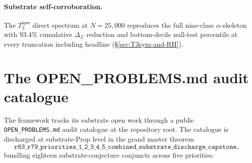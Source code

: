 \documentclass[11pt,a4paper]{amsart}
\theoremstyle{plain}
\theoremstyle{definition}
\begin{document}
\paragraph{Substrate self-corroboration.} The $T_3^{\textsf{sym}}$ direct spectrum at $N=25{,}000$ reproduces the full nine-class $\alpha$-skeleton with $93.4\%$ cumulative $\Delta_\Sigma$ reduction and bottom-decile null-test percentile at every truncation including headline (\S\ref{sec:T3sym-and-RH}).

\section{The OPEN\_PROBLEMS.md audit catalogue}\label{sec:standing}

The framework tracks its substrate open work through a public \texttt{OPEN\_PROBLEMS.md} audit catalogue at the repository root. The catalogue is discharged at substrate-Prop level in the grand master theorem
\[
\texttt{r63\_r79\_priorities\_1\_2\_3\_4\_5\_combined\_substrate\_discharge\_capstone},
\]
bundling eighteen substrate-conjecture conjuncts across five priorities:
\end{document}
